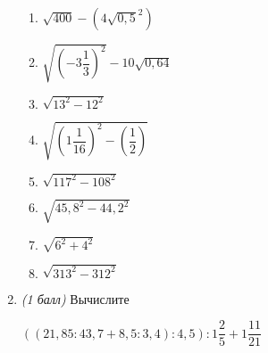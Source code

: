 \documentclass[12pt, a4paper]{article}
\begin{document}
\begin{enumerate}
			\begin{multicols}{2}
			\begin{enumerate}[label=\asbuk*)]
				\item $\sqrt{400}-(4\sqrt{0,5}^{2})$
				\item $\sqrt{\left( -3\dfrac{1}{3}\right)^{2} }-10\sqrt{0,64}$
				\item $\sqrt{13^{2}-12^2}$
				\item $\sqrt{\left( 1\dfrac{1}{16}\right)^2-\left( \dfrac{1}{2}\right)  }$
				\item $\sqrt{117^2-108^2}$
				\item $\sqrt{45,8^2-44,2^2}$
				\item $\sqrt{6^2+4^2}$
				\item $\sqrt{313^2-312^2}$ 
			\end{enumerate}
			\end{multicols}
		\item \textit{(1 балл)} Вычислите
		
		$((21,85:43,7+8,5:3,4):4,5):1\dfrac{2}{5}+1\dfrac{11}{21}$
		\end{enumerate}
\end{document}
